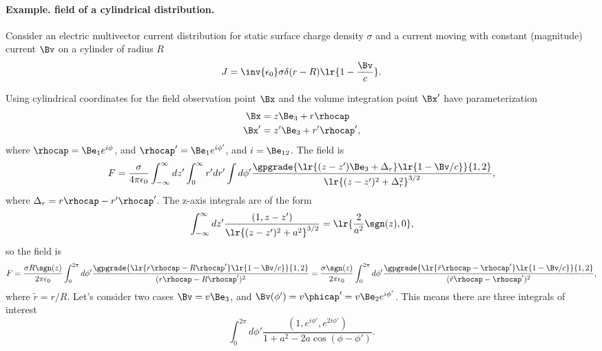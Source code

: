 %
%

\paragraph{Example.  field of a cylindrical distribution.}

Consider an electric multivector current distribution for static surface charge density \( \sigma \) and a current moving with constant (magnitude) current \( \Bv \) on a cylinder of radius \( R \)
\begin{dmath}\label{eqn:cylinderField:20}
J = \inv{\epsilon_0} \sigma \delta( r - R ) \lr{ 1 - \frac{\Bv}{c} }.
\end{dmath}

Using cylindrical coordinates for the field observation point \( \Bx \) and the volume integration point \( \Bx' \) have parameterization
\begin{equation}\label{eqn:cylinderField:40}
\begin{aligned}
\Bx &= z \Be_3 + r \rhocap \\
\Bx' &= z' \Be_3 + r' \rhocap',
\end{aligned}
\end{equation}
where \( \rhocap = \Be_1 e^{i \phi} \), and \( \rhocap' = \Be_1 e^{i \phi'} \), and \( i = \Be_{12} \).
The field is
\begin{dmath}\label{eqn:cylinderField:60}
F = \frac{\sigma}{4 \pi \epsilon_0}
\int_{-\infty}^\infty dz' \int_0^\infty r' dr' \int d\phi' \frac{
   \gpgrade{ \lr{ (z-z') \Be_3 + \Delta_r }\lr{ 1 - \Bv/c }  }{1,2}
}{ \lr{ (z -z')^2 + \Delta_r^2 }^{3/2} },
\end{dmath}
where \( \Delta_r = r \rhocap - r' \rhocap' \).
The z-axis integrals are of the form
\begin{dmath}\label{eqn:cylinderField:80}
\int_{-\infty}^\infty dz' \frac{ (1, z-z') }{ \lr{(z-z')^2 + a^2 }^{3/2}}
=
\lr{ \frac{2}{a^2} \sgn(z), 0 },
\end{dmath}
so the field is
\begin{dmath}\label{eqn:cylinderField:100}
F
=
\frac{\sigma R \sgn(z)}{2 \pi \epsilon_0}
\int_0^{2 \pi} d\phi' \frac{
   \gpgrade{ \lr{ r\rhocap - R \rhocap' } \lr{ 1 - \Bv/c } }{1,2}
}
{ (r\rhocap - R \rhocap')^2 }
=
\frac{\sigma \sgn(z)}{2 \pi \epsilon_0}
\int_0^{2 \pi} d\phi' \frac{
   \gpgrade{ \lr{ \tilde{r}\rhocap - \rhocap' } \lr{ 1 - \Bv/c } }{1,2}
}
{ (\tilde{r}\rhocap - \rhocap')^2 },
\end{dmath}
where \( \tilde{r} = r/R \).
Let's consider two cases \( \Bv = v \Be_3 \), and \( \Bv(\phi') = v \phicap' = v \Be_2 e^{i\phi'} \).  This means there are three integrals of interest
\begin{dmath}\label{eqn:cylinderField:120}
\int_0^{2 \pi} d\phi' \frac{(1, e^{i\phi'}, e^{2 i\phi'})}{1 + a^2 - 2 a \cos(\phi-\phi')}.
\end{dmath}
